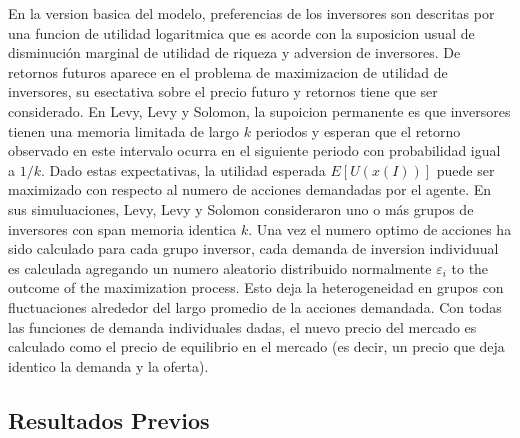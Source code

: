 \documentclass[12pts]{article}
\begin{document}
\quad En la version basica del modelo, preferencias de los inversores son descritas por una funcion de utilidad logaritmica que es acorde con la suposicion usual de disminución marginal de utilidad de riqueza y adversion de inversores. De retornos futuros aparece en el problema de maximizacion de utilidad de inversores, su esectativa sobre el precio futuro y retornos tiene que ser considerado. En Levy, Levy y Solomon, la supoicion permanente es que inversores tienen una memoria limitada de largo $k$ periodos y esperan que el retorno observado en este intervalo ocurra en el siguiente periodo con probabilidad igual a $1/k$. Dado estas expectativas, la utilidad esperada $E[U(x(I))] $ puede ser maximizado con respecto al numero de acciones demandadas por el agente. En sus simuluaciones, Levy, Levy y Solomon consideraron uno o más grupos de inversores con span memoria identica $k$. Una vez el numero  optimo de  acciones ha sido calculado para cada grupo inversor, cada demanda de inversion individuual es calculada agregando un numero aleatorio distribuido normalmente $\varepsilon_i$ to the outcome of the maximization process. Esto deja la heterogeneidad en grupos con fluctuaciones alrededor del largo promedio de la acciones demandada. Con todas las funciones de demanda individuales dadas, el nuevo precio del mercado es calculado como el precio de equilibrio en el mercado (es decir, un precio que deja identico la demanda y la oferta).
\subsection*{Resultados Previos}  
\end{document}
